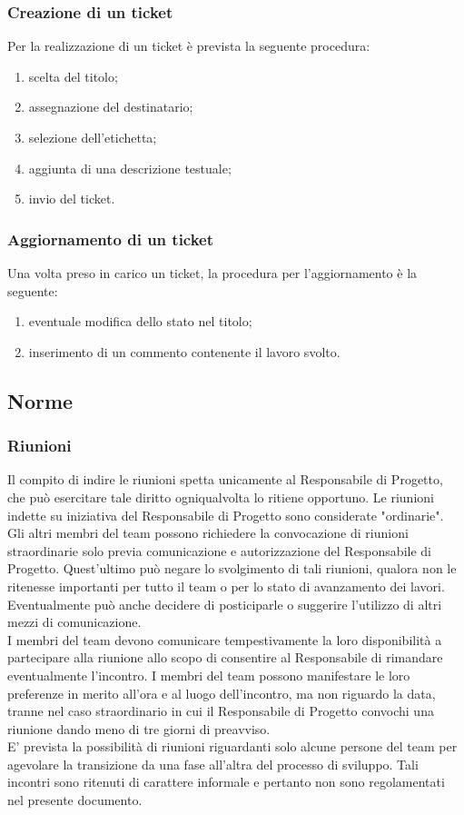 		\subsubsection{Creazione di un ticket}
			Per la realizzazione di un ticket è prevista la seguente procedura:
			\begin{enumerate}
				\item scelta del titolo;
				\item assegnazione del destinatario;
				\item selezione dell'etichetta;
				\item aggiunta di una descrizione testuale;
				\item invio del ticket.
			\end{enumerate}
		\subsubsection{Aggiornamento di un ticket}
			Una volta preso in carico un ticket, la procedura per l’aggiornamento è la seguente:
			\begin{enumerate}
				\item eventuale modifica dello stato nel titolo;
				\item inserimento di un commento contenente il lavoro svolto.
			\end{enumerate}
	\subsection{Norme}
		\subsubsection{Riunioni}
			Il compito di indire le riunioni spetta unicamente al Responsabile di Progetto, che può esercitare tale diritto ogniqualvolta lo ritiene opportuno. Le riunioni indette su iniziativa del Responsabile di Progetto sono considerate "ordinarie".\\
			Gli altri membri del team possono richiedere la convocazione di riunioni straordinarie solo previa comunicazione e autorizzazione del Responsabile di Progetto. Quest'ultimo può negare lo svolgimento di tali riunioni, qualora non le ritenesse importanti per tutto il team o per lo stato di avanzamento dei lavori. Eventualmente può anche decidere di posticiparle o	suggerire l'utilizzo di altri mezzi di comunicazione.\\
			I membri del team devono comunicare tempestivamente la loro disponibilità a partecipare alla riunione allo scopo di consentire al Responsabile di rimandare eventualmente l'incontro. I membri del team possono manifestare le loro preferenze in merito all'ora e al luogo dell'incontro, ma non riguardo la data, tranne nel caso straordinario in cui il Responsabile di Progetto convochi una riunione dando meno di tre giorni di preavviso.\\
			E' prevista la possibilità di riunioni riguardanti solo alcune persone del team per agevolare la transizione da una fase all'altra del processo di sviluppo. Tali incontri sono ritenuti di carattere informale e pertanto non sono regolamentati nel presente documento.
